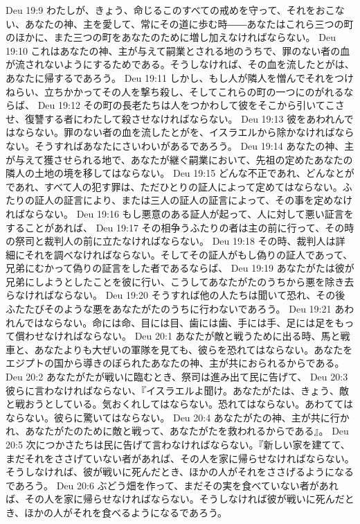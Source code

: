 Deu 19:9  わたしが、きょう、命じるこのすべての戒めを守って、それをおこない、あなたの神、主を愛して、常にその道に歩む時――あなたはこれら三つの町のほかに、また三つの町をあなたのために増し加えなければならない。
Deu 19:10  これはあなたの神、主が与えて嗣業とされる地のうちで、罪のない者の血が流されないようにするためである。そうしなければ、その血を流したとがは、あなたに帰するであろう。
Deu 19:11  しかし、もし人が隣人を憎んでそれをつけねらい、立ちかかってその人を撃ち殺し、そしてこれらの町の一つにのがれるならば、
Deu 19:12  その町の長老たちは人をつかわして彼をそこから引いてこさせ、復讐する者にわたして殺させなければならない。
Deu 19:13  彼をあわれんではならない。罪のない者の血を流したとがを、イスラエルから除かなければならない。そうすればあなたにさいわいがあるであろう。
Deu 19:14  あなたの神、主が与えて獲させられる地で、あなたが継ぐ嗣業において、先祖の定めたあなたの隣人の土地の境を移してはならない。
Deu 19:15  どんな不正であれ、どんなとがであれ、すべて人の犯す罪は、ただひとりの証人によって定めてはならない。ふたりの証人の証言により、または三人の証人の証言によって、その事を定めなければならない。
Deu 19:16  もし悪意のある証人が起って、人に対して悪い証言をすることがあれば、
Deu 19:17  その相争うふたりの者は主の前に行って、その時の祭司と裁判人の前に立たなければならない。
Deu 19:18  その時、裁判人は詳細にそれを調べなければならない。そしてその証人がもし偽りの証人であって、兄弟にむかって偽りの証言をした者であるならば、
Deu 19:19  あなたがたは彼が兄弟にしようとしたことを彼に行い、こうしてあなたがたのうちから悪を除き去らなければならない。
Deu 19:20  そうすれば他の人たちは聞いて恐れ、その後ふたたびそのような悪をあなたがたのうちに行わないであろう。
Deu 19:21  あわれんではならない。命には命、目には目、歯には歯、手には手、足には足をもって償わせなければならない。
Deu 20:1  あなたが敵と戦うために出る時、馬と戦車と、あなたよりも大ぜいの軍隊を見ても、彼らを恐れてはならない。あなたをエジプトの国から導きのぼられたあなたの神、主が共におられるからである。
Deu 20:2  あなたがたが戦いに臨むとき、祭司は進み出て民に告げて、
Deu 20:3  彼らに言わなければならない、『イスラエルよ聞け。あなたがたは、きょう、敵と戦おうとしている。気おくれしてはならない。恐れてはならない。あわててはならない。彼らに驚いてはならない。
Deu 20:4  あなたがたの神、主が共に行かれ、あなたがたのために敵と戦って、あなたがたを救われるからである』。
Deu 20:5  次につかさたちは民に告げて言わなければならない。『新しい家を建てて、まだそれをささげていない者があれば、その人を家に帰らせなければならない。そうしなければ、彼が戦いに死んだとき、ほかの人がそれをささげるようになるであろう。
Deu 20:6  ぶどう畑を作って、まだその実を食べていない者があれば、その人を家に帰らせなければならない。そうしなければ彼が戦いに死んだとき、ほかの人がそれを食べるようになるであろう。
